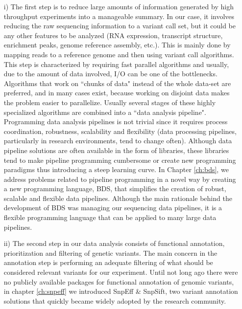 \begin{itemize}
\item[i)] The first step is to reduce large amounts of information generated by high throughput experiments into a manageable summary. 
In our case, it involves reducing the raw sequencing information to a variant call set, but it could be any other features to be analyzed (RNA expression, transcript structure, enrichment peaks, genome reference assembly, etc.). 
This is mainly done by mapping reads to a reference genome and then using variant call algorithms. 
This step is characterized by requiring fast parallel algorithms and usually, due to the amount of data involved, I/O can be one of the bottlenecks. Algorithms that work on ``chunks of data" instead of the whole data-set are preferred, and in many cases exist, because working on disjoint data makes the problem easier to parallelize. 
Usually several stages of these highly specialized algorithms are combined into a ``data analysis pipeline". 
Programming data analysis pipelines is not trivial since it requires process coordination, robustness, scalability and flexibility (data processing pipelines, particularly in research environments, tend to change often). 
Although data pipeline solutions are often available in the form of libraries, these libraries tend to make pipeline programming cumbersome or create new programming paradigms thus introducing a steep learning curve. 
In Chapter \ref{ch:bds}, we address problems related to pipeline programming in a novel way by creating a new programming language, BDS, that simplifies the creation of robust, scalable and flexible data pipelines. 
Although the main rationale behind the development of BDS was managing our sequencing data pipelines, it is a flexible programming language that can be applied to many large data pipelines.

\item[ii)] The second step in our data analysis consists of functional annotation, prioritization and filtering of genetic variants. 
The main concern in the annotation step is performing an adequate filtering of what should be considered relevant variants for our experiment. 
Until not long ago there were no publicly available packages for functional annotation of genomic variants, in chapter \ref{ch:snpeff} we introduced SnpEff \& SnpSift, two variant annotation solutions that quickly became widely adopted by the research community. 


\end{itemize}
